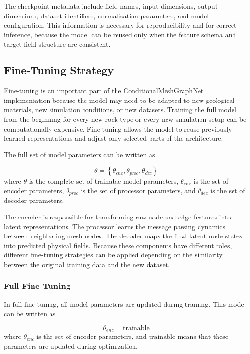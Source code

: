 The checkpoint metadata include field names, input dimensions, output dimensions, dataset identifiers, normalization parameters, and model configuration. This information is necessary for reproducibility and for correct inference, because the model can be reused only when the feature schema and target field structure are consistent.

\subsection{Fine-Tuning Strategy}

Fine-tuning is an important part of the ConditionalMeshGraphNet implementation because the model may need to be adapted to new geological materials, new simulation conditions, or new datasets. Training the full model from the beginning for every new rock type or every new simulation setup can be computationally expensive. Fine-tuning allows the model to reuse previously learned representations and adjust only selected parts of the architecture.

The full set of model parameters can be written as

\begin{equation}
\theta
=
\left\{
\theta_{enc},
\theta_{proc},
\theta_{dec}
\right\}
\end{equation}
where \(\theta\) is the complete set of trainable model parameters, \(\theta_{enc}\) is the set of encoder parameters, \(\theta_{proc}\) is the set of processor parameters, and \(\theta_{dec}\) is the set of decoder parameters.

The encoder is responsible for transforming raw node and edge features into latent representations. The processor learns the message passing dynamics between neighboring mesh nodes. The decoder maps the final latent node states into predicted physical fields. Because these components have different roles, different fine-tuning strategies can be applied depending on the similarity between the original training data and the new dataset.

\subsubsection{Full Fine-Tuning}

In full fine-tuning, all model parameters are updated during training. This mode can be written as

\begin{equation}
\theta_{enc}
=
\text{trainable}
\end{equation}
where \(\theta_{enc}\) is the set of encoder parameters, and \(\text{trainable}\) means that these parameters are updated during optimization.

